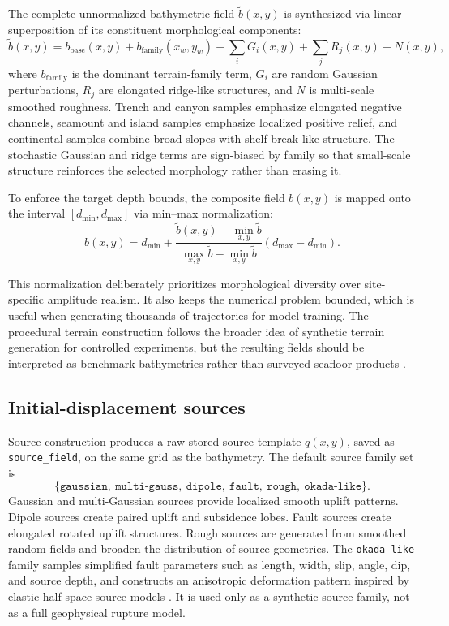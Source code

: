 The complete unnormalized bathymetric field $\tilde{b}(x,y)$ is synthesized via linear superposition of its constituent morphological components:
\begin{equation}
\tilde{b}(x,y) = b_{\mathrm{base}}(x,y) + b_{\mathrm{family}}(x_w,y_w) + \sum_i G_i(x,y) + \sum_j R_j(x,y) + N(x,y),
\end{equation}
where $b_{\mathrm{family}}$ is the dominant terrain-family term, $G_i$ are random Gaussian perturbations, $R_j$ are elongated ridge-like structures, and $N$ is multi-scale smoothed roughness. Trench and canyon samples emphasize elongated negative channels, seamount and island samples emphasize localized positive relief, and continental samples combine broad slopes with shelf-break-like structure. The stochastic Gaussian and ridge terms are sign-biased by family so that small-scale structure reinforces the selected morphology rather than erasing it.

To enforce the target depth bounds, the composite field $b(x,y)$ is mapped onto the interval $[d_{\min}, d_{\max}]$ via min–max normalization:
\begin{equation}
b(x,y) = d_{\min} + \frac{\tilde{b}(x,y) - \min_{x,y}\tilde{b}}{\max_{x,y}\tilde{b} - \min_{x,y}\tilde{b}} (d_{\max} - d_{\min}).
\end{equation}

This normalization deliberately prioritizes morphological diversity over site-specific amplitude realism. It also keeps the numerical problem bounded, which is useful when generating thousands of trajectories for model training. The procedural terrain construction follows the broader idea of synthetic terrain generation for controlled experiments, but the resulting fields should be interpreted as benchmark bathymetries rather than surveyed seafloor products \citep{musgrave1989terrain}.

\subsection{Initial-displacement sources}
\label{subsec:initial-displacement-sources}

Source construction produces a raw stored source template $q(x, y)$, saved as \texttt{source\_field}, on the same grid as the bathymetry. The default source family set is
$$
\{\texttt{gaussian},\ \texttt{multi-gauss},\ \texttt{dipole},\ \texttt{fault},\ \texttt{rough},\ \texttt{okada-like}\}.
$$
Gaussian and multi-Gaussian sources provide localized smooth uplift patterns. Dipole sources create paired uplift and subsidence lobes. Fault sources create elongated rotated uplift structures. Rough sources are generated from smoothed random fields and broaden the distribution of source geometries. The \texttt{okada-like} family samples simplified fault parameters such as length, width, slip, angle, dip, and source depth, and constructs an anisotropic deformation pattern inspired by elastic half-space source models \citep{okada1985surface}. It is used only as a synthetic source family, not as a full geophysical rupture model.

